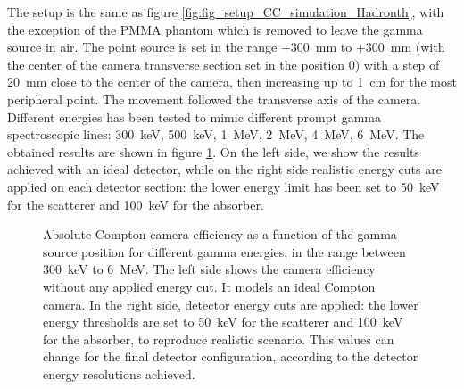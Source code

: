 The setup is the same as figure \ref{fig:fig_setup_CC_simulation_Hadronth}, with the exception of the PMMA phantom which is removed to leave the gamma source in air.
The point source is set in the range $-300$~mm to $+300$~mm (with the center of the camera transverse section set in the position 0) with a step of 20~mm close to the center of the camera, then increasing up to 1~cm for the most peripheral point. The movement followed the transverse axis of the camera. Different energies has been tested to mimic different prompt gamma spectroscopic lines: 300~keV, 500~keV, 1~MeV, 2~MeV, 4~MeV, 6~MeV.\newline
The obtained results are shown in figure \ref{fig::efficiency_study}. On the left side, we show the results achieved with an ideal detector, while on the right side realistic energy cuts are applied on each detector section: the lower energy limit  has been set to 50~keV for the scatterer and 100~keV for the absorber.

\begin{figure} [!hbtp]	
\centering
{}
\caption{Absolute Compton camera efficiency as a function of the gamma source position for different gamma energies, in the range between 300~keV to 6~MeV. The left side shows the camera efficiency without any applied energy cut. It models an ideal Compton camera. In the right side, detector energy cuts are applied: the lower energy thresholds are set to 
50~keV for the scatterer and 100~keV for the absorber, to reproduce realistic scenario. This values can change for the final detector configuration, according to the detector energy resolutions achieved.}
\label{fig::efficiency_study}
\end{figure}

